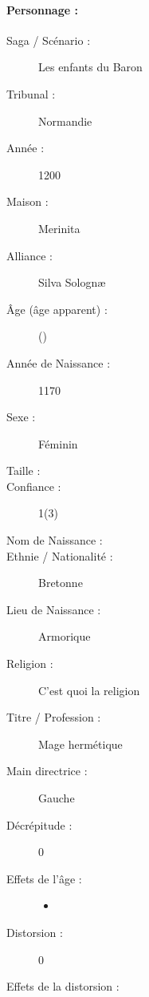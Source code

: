 \pagestyle{fancy}
\thispagestyle{plain}
{\Large \paragraph*{\Large Personnage :} \magusname}
\begin{multicols}{2}
\begin{description}
\item[Saga / Scénario :] Les enfants du Baron
\item[Tribunal :] Normandie
\item[Année :] 1200
\item[Maison :] Merinita
\item[Alliance :] Silva Solognæ
\item[Âge (âge apparent) :] \magusage{} (\magusapparentage)
\item[Année de Naissance :] 1170
\item[Sexe :] Féminin
\item[Taille :] \magussize
\item[Confiance :] 1(3)
\columnbreak
\item[Nom de Naissance :] \magusbirthname
\item[Ethnie /  Nationalité :] Bretonne
\item[Lieu de Naissance :] Armorique
\item[Religion :] C'est quoi la religion
\item[Titre / Profession :] Mage hermétique
\item[Main directrice :] Gauche
\vspace{-1em}
\end{description}
\end{multicols}
\begin{multicols}{2}
\begin{description}
\item[Décrépitude :] 0
\item[Effets de l'âge :]\hspace{0pt}
\begin{itemize}
\item
\end{itemize}
\columnbreak
\item[Distorsion :] 0
\item[Effets de la distorsion :]\hspace{0pt}
\magusscarslong
\end{description}
\end{multicols}
